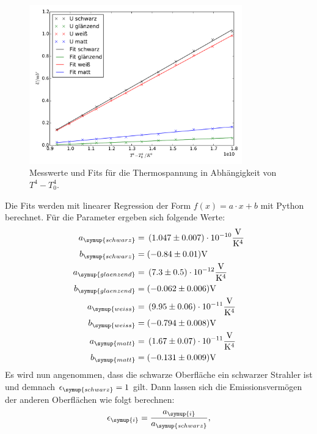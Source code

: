 \begin{figure}
  \centering
  \includegraphics[width=0.82\textwidth]{thermospannung.pdf}
  \caption{Messwerte und Fits für die Thermospannung in Abhängigkeit von \mbox{$T^4 - T_0^4$.}}
  \label{fig:thermospannung}
\end{figure}
\newline
Die Fits werden mit linearer Regression der Form $f(x) = a \cdot x + b $ mit Python
berechnet.
Für die Parameter ergeben sich folgende Werte:
\begin{align*}
  a_\symup{schwarz}   &= \,(1.047\pm0.007)\cdot10^{-10} \si{\frac{\volt}{\kelvin^4}} \\
  b_\symup{schwarz}   &= (-0.84\pm0.01) \si{\volt} \\
  a_\symup{glaenzend} &= \,(7.3\pm0.5)\cdot10^{-12} \si{\frac{\volt}{\kelvin^4}} \\
  b_\symup{glaenzend} &= (-0.062\pm0.006) \si{\volt} \\
  a_\symup{weiss}     &= \,(9.95\pm0.06)\cdot10^{-11} \si{\frac{\volt}{\kelvin^4}} \\
  b_\symup{weiss}     &= (-0.794\pm0.008) \si{\volt} \\
  a_\symup{matt}      &= \,(1.67\pm0.07)\cdot10^{-11} \si{\frac{\volt}{\kelvin^4}} \\
  b_\symup{matt}      &= (-0.131\pm0.009) \si{\volt}
\end{align*}
Es wird nun angenommen, dass die schwarze Oberfläche ein schwarzer Strahler ist
und demnach $\epsilon_\symup{schwarz} = 1$ gilt.
Dann lassen sich die Emissionsvermögen der anderen Oberflächen wie folgt berechnen:
\begin{equation}
  \epsilon_\symup{i} = \frac{a_\symup{i}}{a_\symup{schwarz}},
  \label{eqn:epsilon}
\end{equation}
